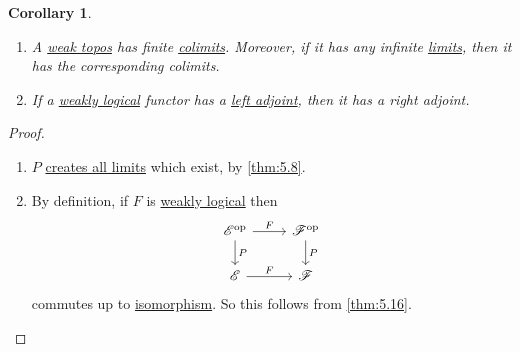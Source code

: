 \documentclass{article}
\newtheorem{ncor}[nthm]{Corollary}
\begin{document}
\begin{ncor}\label{lem:7.10}\leavevmode
  \begin{enumerate}[label=(\roman*)]
    \item A \hyperlink{def:wtopos}{weak topos} has finite \hyperlink{def:limit}{colimits}.
      Moreover, if it has any infinite \hyperlink{def:limit}{limits}, then it has the corresponding colimits.
    \item If a \hyperlink{def:wtopos}{weakly logical} functor has a \hyperlink{def:adj}{left adjoint}, then it has a right adjoint.
  \end{enumerate}
\end{ncor}
\begin{proof}\leavevmode
  \begin{enumerate}[label=(\roman*)]
    \item $P$ \hyperlink{def:clim}{creates all limits} which exist, by \cref{thm:5.8}.
    \item By definition, if $F$ is \hyperlink{def:wtopos}{weakly logical} then
      \begin{equation*}
      \begin{tikzcd}
        \mathscr{E}^\text{op} \rar{F} \dar{P}& \mathscr{F}^\text{op} \dar{P}\\
        \mathscr{E} \rar{F} & \mathscr{F}
      \end{tikzcd}
      \end{equation*}
      commutes up to \hyperlink{def:iso}{isomorphism}. So this follows from \cref{thm:5.16}.
  \end{enumerate}
\end{proof}
\printindex
\end{document}
